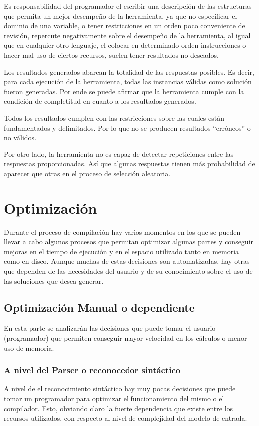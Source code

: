 Es responsabilidad del programador el escribir una descripción de las estructuras
que permita un mejor desempeño de la herramienta, ya que no especificar el dominio de una variable,
o tener restricciones en un orden poco conveniente de revisión, repercute 
negativamente sobre el desempeño de la herramienta, al igual que en cualquier otro lenguaje,
el colocar en determinado orden instrucciones o hacer mal uso de ciertos recursos, suelen tener
resultados no deseados.

Los resultados generados abarcan la totalidad de las respuestas posibles. Es decir,
para cada ejecución de la herramienta, todas las instancias válidas como solución
fueron generadas. Por ende se puede afirmar que la herramienta cumple con la condición
de completitud en cuanto a los resultados generados.

Todos los resultados cumplen con las restricciones sobre las cuales están fundamentados y
delimitados. Por lo que no se producen resultados ``erróneos'' o no válidos.

Por otro lado, la herramienta no es capaz de detectar repeticiones entre
las respuestas proporcionadas. Así que algunas respuestas tienen más probabilidad de 
aparecer que otras en el proceso de selección aleatoria.


\chapter{Optimización}
\label{optimizaciones}
Durante el proceso de compilación hay varios momentos en los que se pueden 
llevar a cabo algunos procesos que permitan optimizar algunas partes y conseguir
mejoras en el tiempo de ejecución y en el espacio utilizado tanto en memoria 
como en disco.
Aunque muchas de estas decisiones son automatizadas, hay otras que dependen de 
las necesidades del usuario y de su conocimiento sobre el uso de las soluciones 
que desea generar.

\section{Optimización Manual o dependiente}
En esta parte se analizarán las decisiones que puede tomar el usuario 
(programador) que permiten conseguir mayor velocidad en los cálculos o menor uso
de memoria.

\subsection{A nivel del Parser o reconocedor sintáctico}\label {imp_y_res:parser}
A nivel de el reconocimiento sintáctico hay muy pocas decisiones que puede tomar un programador para 
optimizar el funcionamiento del mismo o el compilador. Esto, obviando claro la 
fuerte dependencia que existe entre los recursos utilizados, con 
respecto al nivel de complejidad del modelo de entrada.


